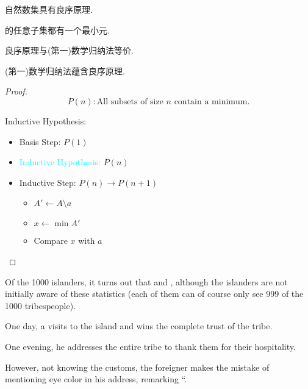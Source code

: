 自然数集具有良序原理. 

\begin{definition}
    的任意子集都有一个最小元. 
\end{definition}

\begin{theorem}{}
    良序原理与(第一)数学归纳法等价. 
\end{theorem}

\begin{lemma}
    (第一)数学归纳法蕴含良序原理. 
  \end{lemma}
  \begin{proof}

      \[
        P(n): \text{All subsets of size $n$ contain a minimum.}
      \]

      Inductive Hypothesis:
      \begin{itemize}
        \item Basis Step: $P(1)$
        \item\textcolor{cyan}{Inductive Hypothesis:} $P(n)$
        \item Inductive Step: $P(n) \to P(n+1)$
          
            \begin{itemize}
              \item $A' \gets A \setminus {a}$
              \item $x \gets \min A'$
              \item Compare $x$ with $a$
            \end{itemize}
          
      \end{itemize}
    \end{proof}

    \begin{example}
      Of the 1000 islanders,
    it turns out that 
    and ,
    although the islanders are not initially aware of these statistics
    (each of them can of course only see 999 of the 1000 tribespeople). 

    One day, a  visits to the island
    and wins the complete trust of the tribe. 

    One evening, he addresses the entire tribe to thank them
    for their hospitality. 

    However, not knowing the customs,
    the foreigner makes the mistake of mentioning eye color in his address,
    remarking ``. 

    \end{example}

